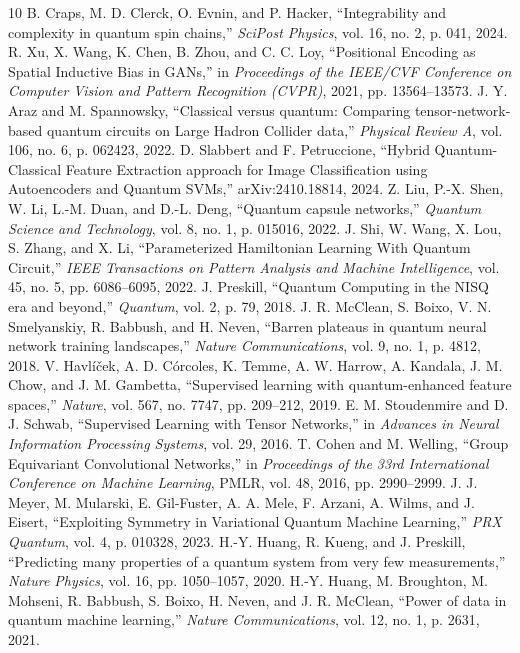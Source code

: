 \documentclass[journal]{IEEEtran}
\begin{document}
\begin{thebibliography}{10}
 B. Craps, M. D. Clerck, O. Evnin, and P. Hacker, ``Integrability and complexity in quantum spin chains,'' \textit{SciPost Physics}, vol. 16, no. 2, p. 041, 2024.
 R. Xu, X. Wang, K. Chen, B. Zhou, and C. C. Loy, ``Positional Encoding as Spatial Inductive Bias in GANs,'' in \textit{Proceedings of the IEEE/CVF Conference on Computer Vision and Pattern Recognition (CVPR)}, 2021, pp. 13564--13573.
 J. Y. Araz and M. Spannowsky, ``Classical versus quantum: Comparing tensor-network-based quantum circuits on Large Hadron Collider data,'' \textit{Physical Review A}, vol. 106, no. 6, p. 062423, 2022.
 D. Slabbert and F. Petruccione, ``Hybrid Quantum-Classical Feature Extraction approach for Image Classification using Autoencoders and Quantum SVMs,'' arXiv:2410.18814, 2024.
 Z. Liu, P.-X. Shen, W. Li, L.-M. Duan, and D.-L. Deng, ``Quantum capsule networks,'' \textit{Quantum Science and Technology}, vol. 8, no. 1, p. 015016, 2022.
 J. Shi, W. Wang, X. Lou, S. Zhang, and X. Li, ``Parameterized Hamiltonian Learning With Quantum Circuit,'' \textit{IEEE Transactions on Pattern Analysis and Machine Intelligence}, vol. 45, no. 5, pp. 6086--6095, 2022.
 J. Preskill, ``Quantum Computing in the NISQ era and beyond,'' \textit{Quantum}, vol. 2, p. 79, 2018.
 J. R. McClean, S. Boixo, V. N. Smelyanskiy, R. Babbush, and H. Neven, ``Barren plateaus in quantum neural network training landscapes,'' \textit{Nature Communications}, vol. 9, no. 1, p. 4812, 2018.
 V. Havl{\'i}{\v c}ek, A. D. C{\'o}rcoles, K. Temme, A. W. Harrow, A. Kandala, J. M. Chow, and J. M. Gambetta, ``Supervised learning with quantum-enhanced feature spaces,'' \textit{Nature}, vol. 567, no. 7747, pp. 209--212, 2019.
 E. M. Stoudenmire and D. J. Schwab, ``Supervised Learning with Tensor Networks,'' in \textit{Advances in Neural Information Processing Systems}, vol. 29, 2016.
 T. Cohen and M. Welling, ``Group Equivariant Convolutional Networks,'' in \textit{Proceedings of the 33rd International Conference on Machine Learning}, PMLR, vol. 48, 2016, pp. 2990--2999.
 J. J. Meyer, M. Mularski, E. Gil-Fuster, A. A. Mele, F. Arzani, A. Wilms, and J. Eisert, ``Exploiting Symmetry in Variational Quantum Machine Learning,'' \textit{PRX Quantum}, vol. 4, p. 010328, 2023.
 H.-Y. Huang, R. Kueng, and J. Preskill, ``Predicting many properties of a quantum system from very few measurements,'' \textit{Nature Physics}, vol. 16, pp. 1050--1057, 2020.
 H.-Y. Huang, M. Broughton, M. Mohseni, R. Babbush, S. Boixo, H. Neven, and J. R. McClean, ``Power of data in quantum machine learning,'' \textit{Nature Communications}, vol. 12, no. 1, p. 2631, 2021.
\end{thebibliography}
\end{document}

